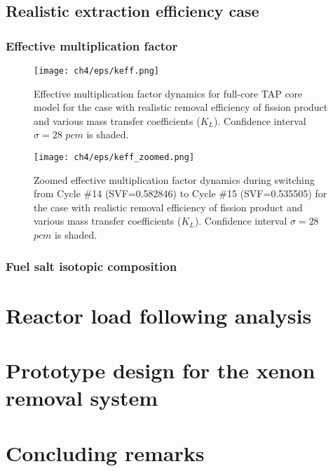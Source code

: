 \subsection{Realistic extraction efficiency case}

\subsubsection{Effective multiplication factor}

\begin{figure}[htp!] %
	\centering
	\texttt{[image: ch4/eps/keff.png]}
	\caption{Effective multiplication factor dynamics for full-core \gls{TAP} 
		core model for the case with realistic removal efficiency of fission 
		product and various mass transfer coefficients ($K_L$). 
		Confidence interval $\sigma=28$ $pcm$ is shaded.}
	\label{fig:keff-eps-var}
\end{figure}

\begin{figure}[hbp!] %
	\centering
	\texttt{[image: ch4/eps/keff\_zoomed.png]}
	\caption{Zoomed effective multiplication factor dynamics during switching 
	from Cycle \#14 (\gls{SVF}=0.582846) to  Cycle \#15 (\gls{SVF}=0.535505) 
	for the case with realistic removal efficiency of fission 
		product and various mass transfer coefficients ($K_L$). 
		Confidence interval $\sigma=28$ $pcm$ is shaded.}
	\label{fig:keff-eps-var-zoom}
\end{figure}

\subsubsection{Fuel salt isotopic composition}

\section{Reactor load following analysis}

\section{Prototype design for the xenon removal system}

\section{Concluding remarks}